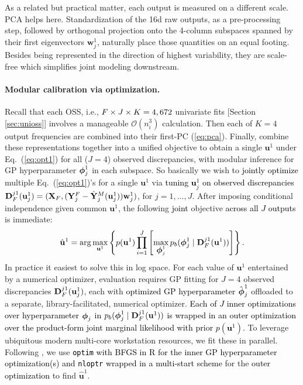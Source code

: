 \documentclass[12pt]{article}
\newcommand{\blu}[1]{\textcolor{black}{#1}} %
\newcommand{\blunew}[1]{\textcolor{black}{#1}} %
\newcommand{\bm}[1]{\mbox{\boldmath $#1$}}
\begin{document}
As a related but practical matter, each output is measured on a
different scale.  PCA helps here. Standardization of the 16d
raw outputs, as a pre-processing step, followed by orthogonal projection onto
the 4-column subspaces spanned by their first eigenvectors $\mathbf{w}^1_j$,
naturally place those quantities on an equal footing. Besides being
represented in the direction of highest variability, they are scale-free
which simplifies joint modeling downstream.

\paragraph{Modular calibration via optimization.} 
Recall that each OSS, i.e., $\blunew{F} \times J \times K = 4,672$ univariate
fits [Section \ref{sec:unioss}] involves a manageable $\mathcal{O}(n^3_i)$
calculation. Then each of $K=4$ output frequencies are combined into their
first-PC (\ref{eq:pca}). Finally,  combine these representations together into
a unified objective to obtain a single $\mathbf{u}^1$ under
Eq.~(\ref{eq:opt1}) for all ($J=4$)  observed discrepancies, with modular
inference for GP hyperparameter $\bm{\phi}^1_j$ in each subspace.  So
basically we wish to \blu{jointly optimize} multiple Eq.~(\ref{eq:opt1})'s for
a single $\mathbf{u}^1$ via \blu{tuning $\mathbf{u}^1_j$ on  observed
discrepancies} $\mathbf{D}^{j1}_{\blunew{F}}(\mathbf{u}^1_j) =(
\mathbf{X}_{\blunew{F}}, (\mathbf{Y}_j^F -
\hat{\mathbf{Y}}_j^M(\mathbf{u}^1_j) ) \mathbf{w}^1_j )$, for $j=1, \dots, J$. 
After imposing conditional independence given common
$\mathbf{u}^1$, the following \blu{joint} objective \blu{across all $J$ outputs} is immediate:
\begin{equation}
\hat{\mathbf{u}}^1 = \mathrm{arg}\max_{\mathbf{u}^1} \left\{ p(\mathbf{u}^1) 
\prod^J_{i = 1} \left[ \max_{\bm{\phi}^1_j} 
p_b(\bm{\phi}^1_j \mid \mathbf{D}^{j1}_{\blunew{F}}(\mathbf{u}^1))\right] \right\}. 
\label{eq:opt2}
\end{equation}
In practice it easiest to solve this in log space. For each value
of $\mathbf{u}^1$ entertained by a numerical optimizer, evaluation requires GP
fitting for $J=4$ observed discrepancies
$\mathbf{D}^{j1}_{\blunew{F}}(\mathbf{u}^1_j)$, each with \blu{optimized GP 
hyperparameter} $\hat{\bm{\phi}}^1_j$
offloaded to a separate, library-facilitated, numerical optimizer.  
\blu{Each of $J$ inner optimizations over hyperparameter $\bm{\phi}_j$ in
$p_b(\bm{\phi}^1_j \mid \mathbf{D}^{j1}_{\blunew{F}}(\mathbf{u}^1))$ is wrapped in an outer optimization over the product-form joint marginal likelihood 
with prior $p(\mathbf{u}^1)$. }
To leverage ubiquitous modern multi-core workstation resources, we fit these in
parallel.  Following \citet{Huang:2018}, we use  \blu{{\tt optim} with BFGS in {\sf R} for the inner GP hyperparameter
optimization(s) and}  \blu{{\tt nloptr}  wrapped in a multi-start scheme} for the  \blu{outer optimization} to find $\hat{\mathbf{u}}^1$.
\end{document}
